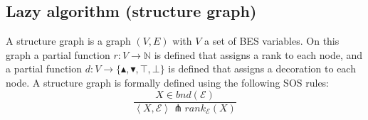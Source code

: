 \subsection{Lazy algorithm (structure graph)}

A structure graph is a graph $(V,E)$ with $V$ a set of BES variables. On
this graph a partial function $r:V\rightarrow \mathbb{N}$ is defined that
assigns a rank to each node, and a partial function $d:V\rightarrow
\{\blacktriangle ,\blacktriangledown ,\top ,\bot \}$ is defined that assigns
a decoration to each node. A structure graph is formally defined using the
following SOS rules:%
\begin{equation*}
\frac{X\in bnd(\mathcal{E})}{\left\langle X,\mathcal{E}\right\rangle
\pitchfork rank_{\mathcal{E}}(X)}
\end{equation*}

